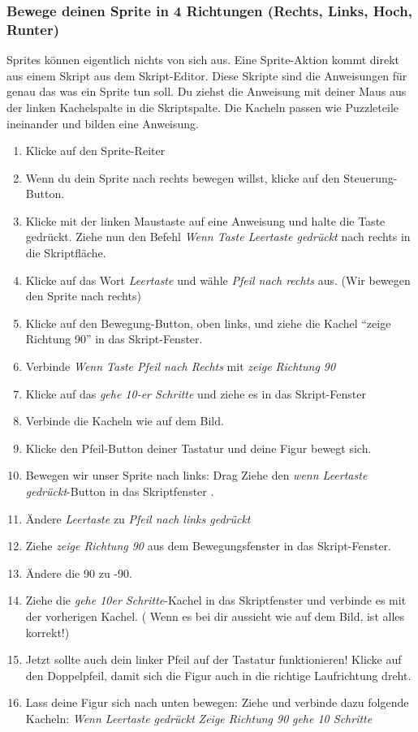 \subsubsection{Bewege deinen Sprite in 4 Richtungen (Rechts, Links, Hoch, Runter)}

Sprites können eigentlich nichts von sich aus. Eine Sprite-Aktion kommt direkt aus einem Skript aus dem Skript-Editor. Diese Skripte sind die Anweisungen für genau das was ein Sprite tun soll.
Du ziehst die Anweisung mit deiner Maus aus der linken Kachelspalte in die Skriptspalte. Die Kacheln passen wie Puzzleteile ineinander und bilden eine Anweisung.


\begin{enumerate}
\item Klicke auf den Sprite-Reiter
\item Wenn du dein Sprite nach rechts bewegen willst, klicke auf den Steuerung-Button.
\item Klicke mit der linken Maustaste auf eine Anweisung und halte die Taste gedrückt. Ziehe nun den Befehl
 \textit{Wenn Taste Leertaste gedrückt} nach rechts in die Skriptfläche. 
\item Klicke auf das Wort \textit{Leertaste} und wähle \textit{Pfeil nach rechts} aus.  (Wir bewegen den Sprite nach rechts)
\item Klicke auf den Bewegung-Button, oben links, und ziehe die Kachel “zeige Richtung 90” in das Skript-Fenster.
\item Verbinde \textit{Wenn Taste Pfeil nach Rechts} mit \textit{zeige Richtung 90}
\item Klicke auf das \textit{gehe 10-er Schritte} und ziehe es in das Skript-Fenster 
\item Verbinde die Kacheln wie auf dem Bild. 
\item Klicke den Pfeil-Button deiner Tastatur und deine Figur bewegt sich.
\item Bewegen wir unser Sprite nach links: Drag Ziehe den \textit{wenn Leertaste gedrückt}-Button in das Skriptfenster .
\item Ändere \textit{Leertaste} zu \textit{Pfeil nach links gedrückt}
\item Ziehe \textit{zeige Richtung 90} aus dem Bewegungsfenster in das Skript-Fenster.
\item Ändere die 90 zu -90.
\item Ziehe die \textit{gehe 10er Schritte}-Kachel in das Skriptfenster und verbinde es mit der vorherigen Kachel.
( Wenn es bei dir aussieht wie auf dem Bild, ist alles korrekt!)
\item Jetzt sollte auch dein linker Pfeil auf der Tastatur funktionieren! Klicke auf den Doppelpfeil, damit sich die Figur auch in die richtige Laufrichtung dreht. 
\item Lass deine Figur sich nach unten bewegen: Ziehe und verbinde dazu folgende Kacheln:
\subitem \textit{Wenn Leertaste gedrückt}
\subitem \textit{Zeige Richtung 90}
\subitem \textit{gehe 10 Schritte}
\end{enumerate}

